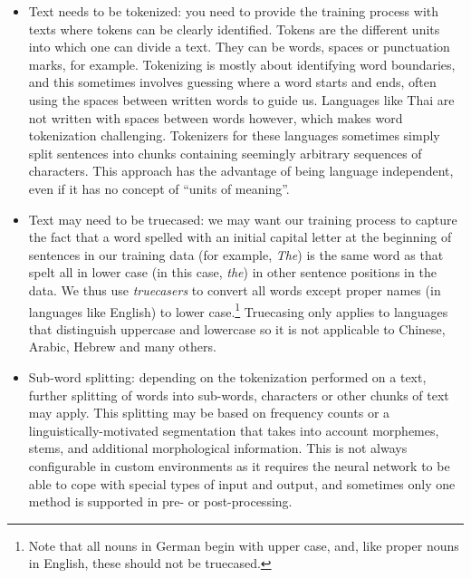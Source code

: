 \documentclass[output=paper]{langscibook}
\begin{document}
\begin{itemize}\sloppy
\item Text needs to be tokenized: you need to provide the training process with texts where tokens can be clearly identified. Tokens are the different units into which one can divide a text. They can be words, spaces or punctuation marks, for example. Tokenizing is mostly about identifying word boundaries, and this sometimes involves guessing where a word starts and ends, often using the spaces between written words to guide us. Languages like Thai are not written with spaces between words however, which makes word tokenization challenging.  Tokenizers for these languages sometimes simply split sentences into chunks containing seemingly arbitrary sequences of characters. This approach has the advantage of being language independent, even if it has no concept of “units of meaning”.

\item Text may need to be truecased: we may want our training process to capture the fact that a word spelled with an initial capital letter at the beginning of sentences in our training data (for example, \textit{The}) is the same word as that spelt all in lower case (in this case, \textit{the}) in other sentence positions in the data. We thus use \textit{truecasers} to convert all words except proper names (in languages like English) to lower case.\footnote{Note that all nouns in German begin with upper case, and, like proper nouns in English, these should not be truecased.} Truecasing only applies to languages that distinguish uppercase and lowercase so it is not applicable to Chinese, Arabic, Hebrew and many others.

\item Sub-word splitting: depending on the tokenization performed on a text, further splitting of words into sub-words, characters or other chunks of text may apply. This splitting may be based on frequency counts or a linguistically-motivated segmentation that takes into account morphemes, stems, and additional morphological information. This is not always configurable in custom environments as it requires the neural network to be able to cope with special types of input and output, and sometimes only one method is supported in pre- or post-processing. 
\end{itemize}
\end{document}
